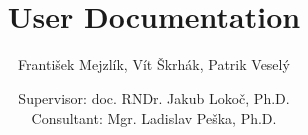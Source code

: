 \documentclass[10pt,a4paper]{article}
\title{\textcool{\bf SOMHunter Video Search Tool} \\ User Documentation}
\author{František Mejzlík, Vít Škrhák, Patrik Veselý}
\date{Supervisor: doc. RNDr. Jakub Lokoč, Ph.D. \\ \vspace{5mm} Consultant: Mgr. Ladislav Peška, Ph.D.}
\begin{document}
\maketitle
\pagebreak
\tableofcontents







%  
% 


\end{document}
